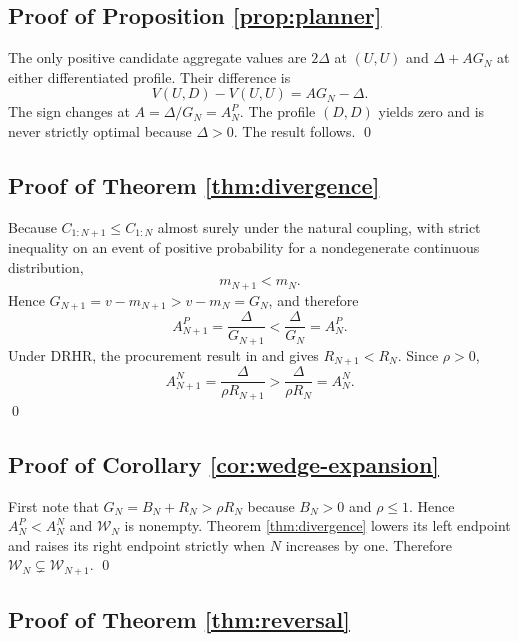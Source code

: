 \subsection{Proof of Proposition \ref{prop:planner}}

The only positive candidate aggregate values are $2\Delta$ at $(U,U)$ and $\Delta+A G_N$ at either differentiated profile. Their difference is
\begin{equation}
V(U,D)-V(U,U)=A G_N-\Delta.
\end{equation}
The sign changes at $A=\Delta/G_N=A_N^P$. The profile $(D,D)$ yields zero and is never strictly optimal because $\Delta>0$. The result follows. \qed

\subsection{Proof of Theorem \ref{thm:divergence}}

Because $C_{1:N+1}\le C_{1:N}$ almost surely under the natural coupling, with strict inequality on an event of positive probability for a nondegenerate continuous distribution,
\begin{equation}
m_{N+1}<m_N.
\end{equation}
Hence $G_{N+1}=v-m_{N+1}>v-m_N=G_N$, and therefore
\begin{equation}
A_{N+1}^P=\frac{\Delta}{G_{N+1}}
<\frac{\Delta}{G_N}=A_N^P.
\end{equation}
Under DRHR, the procurement result in \citet{Li2005} and \citet{XuLi2019} gives $R_{N+1}<R_N$. Since $\rho>0$,
\begin{equation}
A_{N+1}^N=\frac{\Delta}{\rho R_{N+1}}
>\frac{\Delta}{\rho R_N}=A_N^N.
\end{equation}
\qed

\subsection{Proof of Corollary \ref{cor:wedge-expansion}}

First note that $G_N=B_N+R_N>\rho R_N$ because $B_N>0$ and $\rho\le1$. Hence $A_N^P<A_N^N$ and $\mathcal W_N$ is nonempty. Theorem \ref{thm:divergence} lowers its left endpoint and raises its right endpoint strictly when $N$ increases by one. Therefore $\mathcal W_N\subsetneq\mathcal W_{N+1}$. \qed

\subsection{Proof of Theorem \ref{thm:reversal}}

